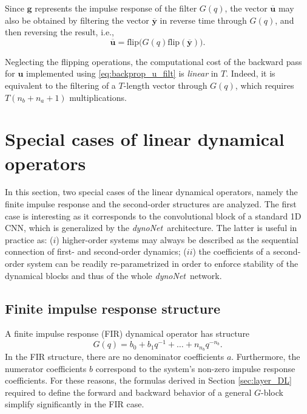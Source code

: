 \documentclass{article}
\newcommand{\q}{q} %
\newcommand{\ac}{a} %
\newcommand{\bb}{b} %
\newcommand{\adjoint}[1]{\overline{#1}}
\newcommand{\tvec}[1]{\mathbf{#1}}
\newcommand{\nsamp}{T}
\newcommand{\Name}{\emph{dynoNet}}
\begin{document}
Since $\tvec{g}$ represents the impulse response of the filter $G(q)$, the vector $\adjoint{\tvec{u}}$ may also be obtained  by filtering the vector $\adjoint{\tvec{y}}$ in reverse time through $G(q)$, and then reversing the result, i.e., 
\begin{equation}
\label{eq:backprop_u_filt}
{\adjoint{\tvec{u}}} = \textrm{flip}\big(G(q)\textrm{flip}(\adjoint{\tvec{y}})\big).
\end{equation}

Neglecting the flipping operations, the computational cost of the backward pass for $\tvec{u}$ implemented using \eqref{eq:backprop_u_filt} is \emph{linear} in $\nsamp$. Indeed, it is equivalent to the filtering of a $\nsamp$-length vector through $G(\q)$, which requires $\nsamp(n_\bb + n_\ac + 1)$ multiplications.  

\section{Special cases of linear dynamical operators} \label{sec:specialcase}

In this section, two special cases of the linear dynamical operators, namely the  finite impulse response  and the second-order structures are analyzed. The first case is interesting as it corresponds to the convolutional block of a standard 1D CNN, which is generalized by the \Name \ architecture. The latter is useful in practice as: ($i$) higher-order systems may always be described as the sequential connection of first- and second-order dynamics; ($ii$) the coefficients of a second-order system can be readily re-parametrized in order to  enforce stability of the dynamical blocks and thus of the whole \Name\ network.   

\subsection{Finite impulse response structure}
A finite impulse response (FIR) dynamical operator has structure
\begin{equation}
G(\q) = \bb_0  + \bb_1 \q^{-1} + \dots + n_{n_\bb} \q^{-n_\bb}.
\end{equation}
In the FIR structure, there are no denominator coefficients $\ac$. Furthermore, the numerator coefficients $\bb$ correspond to the system's non-zero impulse response coefficients. 
For these reasons, the formulas derived in Section \ref{sec:layer_DL} required to define the forward and backward behavior of a general $G$-block simplify significantly in the FIR case. 
\end{document}
